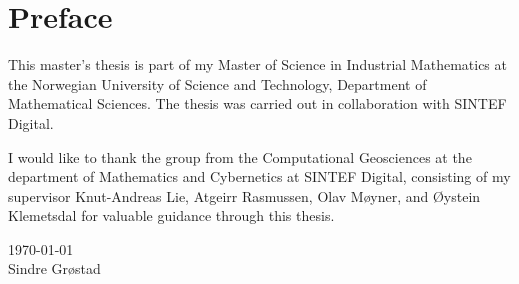 \chapter*{Preface}
This master's thesis is part of my Master of Science in Industrial Mathematics at the Norwegian University of Science and Technology, Department of Mathematical Sciences. The thesis was carried out in collaboration with SINTEF Digital. 

I would like to thank the group from the Computational Geosciences at the department of Mathematics and Cybernetics at SINTEF Digital, consisting of my supervisor Knut-Andreas Lie, Atgeirr Rasmussen, Olav Møyner, and Øystein Klemetsdal for valuable guidance through this thesis.

\today \\
Sindre Grøstad